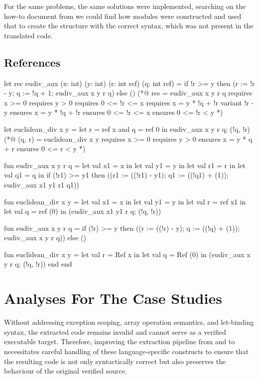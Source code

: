 For the same problems, the same solutions were implemented, searching on the how-to document from \cml we could find how
modules were constructed and used that to create the structure  with the correct syntax, which was not present in 
the translated code.

\subsection{References}

\begin{gospell}
let rec eudiv_aux (x: int) (y: int) (r: int ref) (q: int ref) =
  if !r >= y then (r := !r - y; q := !q + 1; eudiv_aux x y r q)
  else ()
(*@ res = eudiv_aux x y r q
    requires x >= 0
    requires y > 0
    requires 0 <= !r <= x
    requires x = y * !q + !r
    variant !r - y
    ensures x = y * !q + !r
    ensures 0 <= !r <= x
    ensures 0 <= !r < y *)
\end{gospell}

\begin{gospell}
let euclidean_div x y =
    let r = ref x and q = ref 0 in 
  eudiv_aux x y r q;
  (!q, !r)
(*@ (q, r) = euclidean_div x y
    requires x >= 0
    requires y > 0
    ensures x = y * q + r
    ensures 0 <= r < y *)
\end{gospell}

\begin{cakeml}
fun eudiv_aux x y r q = let val x1 = x in
  let val y1 = y in
  let val r1 = r in
  let val q1 = q in
  if (!r1) >= y1
  then ((r1 := ((!r1) - y1); q1 := ((!q1) + (1)); eudiv_aux x1 y1 r1 q1))

fun euclidean_div x y =
  let val x1 = x in
  let val y1 = y in
  let val r = ref x1 in
  let val q = ref (0) in (eudiv_aux x1 y1 r q; (!q, !r))
\end{cakeml}

\begin{cakeml}
fun eudiv_aux x y r q =
  if (!r) >= y
  then ((r := ((!r) - y); q := ((!q) + (1)); eudiv_aux x y r q))
  else ()

fun euclidean_div x y =
  let val r = Ref x in
  let val q = Ref (0) in (eudiv_aux x y r q; (!q, !r)) 
end end
\end{cakeml}

\section{Analyses For The Case Studies}

Without addressing exception scoping, array operation semantics, and let-binding syntax, the extracted code remains invalid 
and cannot serve as a verified executable target. Therefore, improving the extraction pipeline from \ocaml and \gospel to 
\cml necessitates careful handling of these language-specific constructs to ensure that the resulting code is not only 
syntactically correct but also preserves the behaviour of the original verified source.
